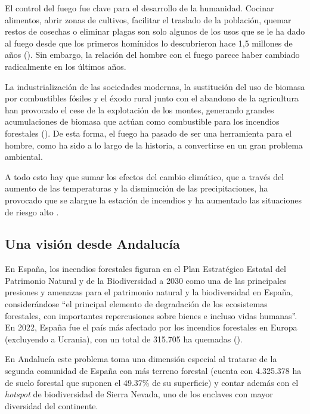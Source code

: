\documentclass[12pt,a4paper,]{book}
\numberwithin{dummy}{section}
\theoremstyle{ocrenumbox}
\theoremstyle{blacknumex}
\theoremstyle{blacknumbox}
\theoremstyle{ocrenum}
\theoremstyle{ocrenum}
\begin{document}
El control del fuego fue clave para el desarrollo de la humanidad.
Cocinar alimentos, abrir zonas de cultivos, facilitar el traslado de la
población, quemar restos de cosechas o eliminar plagas son solo algunos
de los usos que se le ha dado al fuego desde que los primeros homínidos
lo descubrieron hace 1,5 millones de años (\citet{james1989}). Sin
embargo, la relación del hombre con el fuego parece haber cambiado
radicalmente en los últimos años.

La industrialización de las sociedades modernas, la sustitución del uso
de biomasa por combustibles fósiles y el éxodo rural junto con el
abandono de la agricultura han provocado el cese de la explotación de
los montes, generando grandes acumulaciones de biomasa que actúan como
combustible para los incendios forestales (\citet{MataixCerda}). De esta
forma, el fuego ha pasado de ser una herramienta para el hombre, como ha
sido a lo largo de la historia, a convertirse en un gran problema
ambiental.

A todo esto hay que sumar los efectos del cambio climático, que a través
del aumento de las temperaturas y la disminución de las precipitaciones,
ha provocado que se alargue la estación de incendios y ha aumentado las
situaciones de riesgo alto \citep{incendioCamCLim}.

\hypertarget{una-visiuxf3n-desde-andalucuxeda}{%
\subsection*{Una visión desde
Andalucía}\label{una-visiuxf3n-desde-andalucuxeda}}

En España, los incendios forestales figuran en el Plan Estratégico
Estatal del Patrimonio Natural y de la Biodiversidad a 2030 como una de
las principales presiones y amenazas para el patrimonio natural y la
biodiversidad en España, considerándose ``el principal elemento de
degradación de los ecosistemas forestales, con importantes repercusiones
sobre bienes e incluso vidas humanas''. En 2022, España fue el país más
afectado por los incendios forestales en Europa (excluyendo a Ucrania),
con un total de 315.705 ha quemadas (\citet{effis2022}).

En Andalucía este problema toma una dimensión especial al tratarse de la
segunda comunidad de España con más terreno forestal (cuenta con
4.325.378 ha de suelo forestal que suponen el 49.37\% de su superficie)
y contar además con el \emph{hotspot} de biodiversidad de Sierra Nevada,
uno de los enclaves con mayor diversidad del continente.
\end{document}
